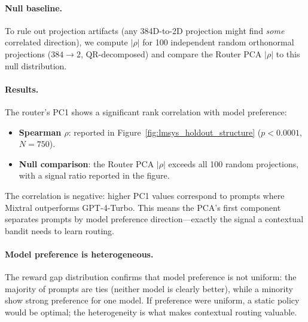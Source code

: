 \paragraph{Null baseline.}
To rule out projection artifacts (any 384D-to-2D projection might find \emph{some} correlated direction), we compute $|\rho|$ for 100 independent random orthonormal projections ($384 \to 2$, QR-decomposed) and compare the Router PCA $|\rho|$ to this null distribution.

\paragraph{Results.}
The router's PC1 shows a significant rank correlation with model preference:
\begin{itemize}[noitemsep,topsep=2pt]
    \item \textbf{Spearman $\rho$}: reported in Figure~\ref{fig:lmsys_holdout_structure} ($p < 0.0001$, $N=750$).
    \item \textbf{Null comparison}: the Router PCA $|\rho|$ exceeds all 100 random projections, with a signal ratio reported in the figure.
\end{itemize}

\noindent
The correlation is negative: higher PC1 values correspond to prompts where Mixtral outperforms GPT-4-Turbo.
This means the PCA's first component separates prompts by model preference direction---exactly the signal a contextual bandit needs to learn routing.

\paragraph{Model preference is heterogeneous.}
The reward gap distribution confirms that model preference is not uniform:
the majority of prompts are ties (neither model is clearly better), while a minority show strong preference for one model.
If preference were uniform, a static policy would be optimal; the heterogeneity is what makes contextual routing valuable.

